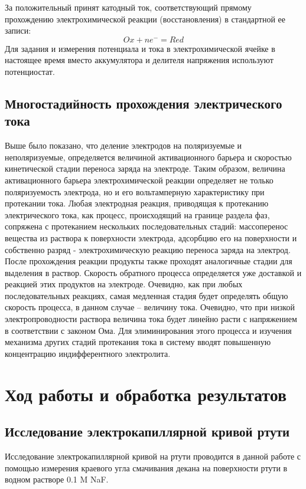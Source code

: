 \documentclass[a4paper,12pt]{article}
\begin{document}
За положительный принят катодный ток, соответствующий прямому прохождению электрохимической реакции (восстановления) в стандартной ее записи:
\[
Ox + ne^{-} = Red
\]
Для задания и измерения потенциала и тока в электрохимической ячейке в
настоящее время вместо аккумулятора и делителя напряжения используют потенциостат.
\subsection{Многостадийность прохождения электрического тока}
Выше было показано, что деление электродов на поляризуемые и неполяризуемые, определяется величиной активационного барьера и скоростью кинетической
стадии переноса заряда на электроде. Таким образом, величина активационного
барьера электрохимической реакции определяет не только поляризуемость электрода, но и его вольтамперную характеристику при протекании тока. Любая электродная реакция, приводящая к протеканию электрического тока, как процесс,
происходящий на границе раздела фаз, сопряжена с протеканием нескольких последовательных стадий: массоперенос вещества из раствора к поверхности электрода, адсорбцию его на поверхности и собственно разряд - электрохимическую
реакцию переноса заряда на электрод. После прохождения реакции продукты также проходят аналогичные стадии для выделения в раствор. Скорость обратного
процесса определяется уже доставкой и реакцией этих продуктов на электроде.
Очевидно, как при любых последовательных реакциях, самая медленная стадия
будет определять общую скорость процесса, в данном случае – величину тока. Очевидно, что при низкой электропроводности раствора величина тока будет линейно
расти с напряжением в соответствии с законом Ома. Для элиминирования этого
процесса и изучения механизма других стадий протекания тока в систему вводят
повышенную концентрацию индифферентного электролита.

\section{Ход работы и обработка результатов}

\subsection{Исследование электрокапиллярной кривой ртути}
Исследование электрокапиллярной кривой на ртути проводится в данной работе с
помощью измерения краевого угла смачивания декана на поверхности ртути в
водном растворе 0.1 M NaF.
\end{document}
